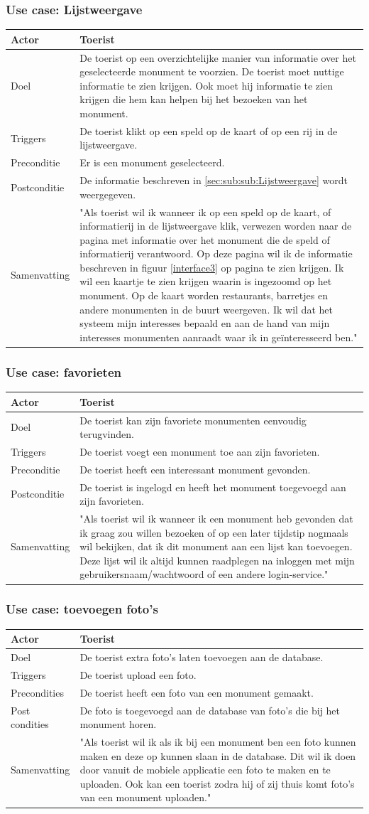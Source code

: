 \documentclass[a4paper,10pt]{article}
\newcommand{\rsubsubsection}[1]{
\subsubsection{#1}\label{sec:sub:sub:#1}
}
\newcommand\addrow[2]{#1 &#2\\ }
\newcommand\addheading[2]{#1 &#2\\ \hline}
\newcommand\tabularhead{\begin{tabular}{| lp{12cm} |}
\hline
}
\newenvironment{usecase}{\tabularhead}{\hline\end{tabular}}
\begin{document}
			\rsubsubsection{Use case: Lijstweergave}
			\begin{usecase} 
			\addheading{Actor}{Toerist} 
			\addrow{Doel}{De toerist op een overzichtelijke manier van informatie over het geselecteerde monument te voorzien. De toerist moet nuttige informatie te zien krijgen. Ook moet hij informatie te zien krijgen die hem kan helpen bij het bezoeken van het monument.}
			\addrow{Triggers}{De toerist klikt op een speld op de kaart of op een rij in de lijstweergave.}
			\addrow{Preconditie}{Er is een monument geselecteerd.}
			\addrow{Postconditie}{De informatie beschreven in \ref{sec:sub:sub:Lijstweergave} wordt weergegeven.}
			\addrow{Samenvatting}{"Als toerist wil ik wanneer ik op een speld op de kaart, of informatierij in de lijstweergave klik, verwezen worden naar de pagina met informatie over het monument die de speld of informatierij verantwoord. Op deze pagina wil ik de informatie beschreven in figuur \ref{interface3} op pagina \pageref{interface3} te zien krijgen. Ik wil een kaartje te zien krijgen waarin is ingezoomd op het monument. Op de kaart worden restaurants, barretjes en andere monumenten in de buurt weergeven. Ik wil dat het systeem mijn interesses bepaald en aan de hand van mijn interesses monumenten aanraadt waar ik in ge\"interesseerd ben."}
			\end{usecase}	

			\rsubsubsection{Use case: favorieten}
			\begin{usecase} 
			\addheading{Actor}{Toerist} 
			\addrow{Doel}{De toerist kan zijn favoriete monumenten eenvoudig terugvinden.}
			\addrow{Triggers}{De toerist voegt een monument toe aan zijn favorieten.}
			\addrow{Preconditie}{De toerist heeft een interessant monument gevonden.}
			\addrow{Postconditie}{De toerist is ingelogd en heeft het monument toegevoegd aan zijn favorieten.}
			\addrow{Samenvatting}{"Als toerist wil ik wanneer ik een monument heb gevonden dat ik graag zou willen bezoeken of op een later tijdstip nogmaals wil bekijken, dat ik dit monument aan een lijst kan toevoegen. Deze lijst wil ik altijd kunnen raadplegen na inloggen met mijn gebruikersnaam/wachtwoord of een andere login-service."}
			\end{usecase}	
			
			\rsubsubsection{Use case: toevoegen foto's}
			\begin{usecase}
			\addheading{Actor}{Toerist}
\addrow{Doel}{De toerist extra foto's laten toevoegen aan de database.}
\addrow{Triggers}{De toerist upload een foto.}
			\addrow{Precondities}{De toerist heeft een foto van een monument gemaakt.}
			\addrow{Post condities}{De foto is toegevoegd aan de database van foto's die bij het monument horen.}
			\addrow{Samenvatting}{"Als toerist wil ik als ik bij een monument ben een foto kunnen maken en deze op kunnen slaan in de database. Dit wil ik doen door vanuit de mobiele applicatie een foto te maken en te uploaden. Ook kan een toerist zodra hij of zij thuis komt foto's van een monument uploaden."}
			\end{usecase}
		
\end{document}
